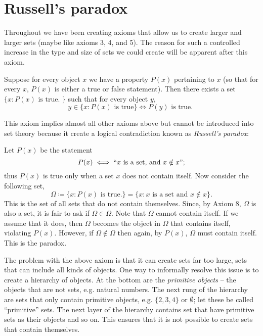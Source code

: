 \documentclass[12pt]{article}
\theoremstyle{remark}
\begin{document}
\section{Russell's paradox}%
\label{sec:Russell's paradox}

Throughout we have been creating axioms that allow us to create larger and larger sets (maybe like axioms 3, 4, and 5).  The reason for such a controlled increase in the type and size of sets we could create will be apparent after this axiom.

\begin{important}
	Suppose for every object $ x $ we have a property $ P(x) $ pertaining to $ x $ (so that for every $ x $, $ P(x) $ is either a true or false statement). Then there exists a set $ \{ x : P(x) \text{ is true. } \} $ such that for every object $ y $, 
	\begin{equation*}
		y \in \{ x : P(x) \text{ is true} \} \iff P(y) \text{ is true. }
	\end{equation*}
\end{important}

This axiom implies almost all other axioms above but cannot be introduced into set theory because it create a logical contradiction known as \textit{Russell's paradox}:\par
Let $ P(x) $ be the statement 
\begin{equation*}
	P(x) \iff ``x \text{ is a set, and } x \notin x";
\end{equation*}
thus $ P(x) $ is true only when a set $ x $ does not contain itself. Now consider the following set, 
\begin{equation*}
	\Omega \coloneqq \{ x : P(x) \text{ is true.} \} = \{ x : x \text{ is a set and } x \notin x \}.
\end{equation*}
This is the set of all sets that do not contain themselves. Since, by Axiom 8, $ \Omega $ is also a set, it is fair to ask if $ \Omega \in \Omega $. Note that $ \Omega $ cannot contain itself. If we assume that it does, then $ \Omega $ becomes the object in $ \Omega $ that contains itself, violating $ P(x) $. However, if $ \Omega \notin \Omega $ then again, by $ P(x) $, $ \Omega $ must contain itself. This is the paradox.  \par

The problem with the above axiom is that it can create sets far too large, sets that can include all kinds of objects. One way to informally resolve this issue is to create a hierarchy of objects. At the bottom are the \textit{primitive objects} -- the objects that are not sets, e.g. natural numbers. The next rung of the hierarchy are sets that only contain primitive objects, e.g. $ \{ 2, 3, 4 \} $ or $ \emptyset $; let these be called ``primitive'' sets. The next layer of the hierarchy contains set that have primitive sets as their objects and so on. This ensures that it is not possible to create sets that contain themselves.  
\end{document}
